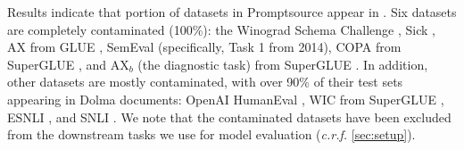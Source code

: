 Results indicate that portion of datasets in Promptsource appear in \dolma. 
Six datasets are completely contaminated (100\%): the Winograd Schema Challenge \citep{wsc}, 
Sick \citep{marelli-etal-2014-sick}, 
AX from GLUE \citep{wang-etal-2018-glue}, 
SemEval (specifically, Task 1 from 2014), 
COPA from SuperGLUE \citep{roemmele2011choice}, 
and AX$_b$ (the diagnostic task) from SuperGLUE \citep{wang2019superglue}.
In addition, other datasets are mostly contaminated, with over 90\% of their test sets appearing in Dolma documents: OpenAI HumanEval \citep{chen2021evaluating}, WIC from SuperGLUE \citep{pilehvar2019wic}, ESNLI \citep{esnli}, and SNLI \citep{snli}.
We note that the contaminated datasets have been excluded from the downstream tasks we use for model evaluation (\textit{c.r.f.} \autoref{sec:setup}).




